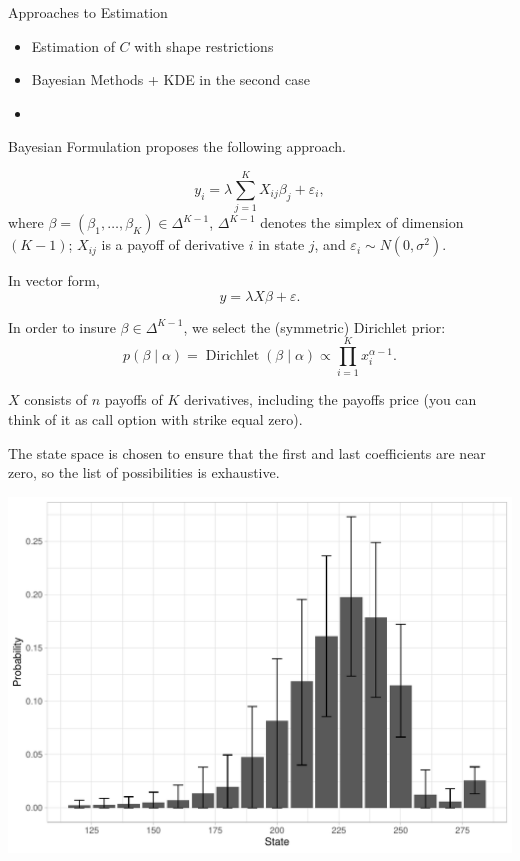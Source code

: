 \documentclass[10pt,aspectratio=43]{beamer}
\begin{document}
\begin{frame}{Approaches to Estimation}
    \begin{itemize}
        \item Estimation of $C$ with shape restrictions {\small\parencite{ait-sahaliaNonparametricOptionPricing2003}}

        \item Bayesian Methods {\small\parencite{fisherSimplexRegression2016,hardleStatePriceDensities2015} + KDE in the second case}
        \item 
    \end{itemize}
\end{frame}

\begin{frame}{Bayesian Formulation}
    \cite{fisherSimplexRegression2016} proposes the following approach.

    \[y_i=\lambda\sum_{j=1}^KX_{ij}\beta_j+\varepsilon_i,\]
    where $\beta=(\beta_1,\dots, \beta_K)\in \Delta^{K-1}$, $\Delta^{K-1}$ denotes the simplex of dimension $(K-1)$; $X_{ij}$ is a payoff of derivative $i$ in state $j$, and $\varepsilon_i\sim N(0,\sigma^2)$.

    In vector form,
    \[y=\lambda X \beta+\varepsilon.\]

    In order to insure $\beta\in \Delta^{K-1}$, we select the (symmetric) Dirichlet prior:
    \[p(\beta\mid \alpha)=\operatorname{Dirichlet}(\beta\mid \alpha)\propto \prod_{i=1}^{K}x_{i}^{\alpha-1}.\]

\end{frame}

\begin{frame}{}
$X$ consists of $n$ payoffs of $K$ derivatives, including the payoffs price (you can think of it as call option with strike equal zero).

The state space is chosen to ensure that the first and last coefficients are near zero, so the list of possibilities is exhaustive.
 \begin{center}
        \includegraphics[width=0.6\linewidth]{betas_23_3.pdf}
    \end{center}

\end{frame}
\end{document}
